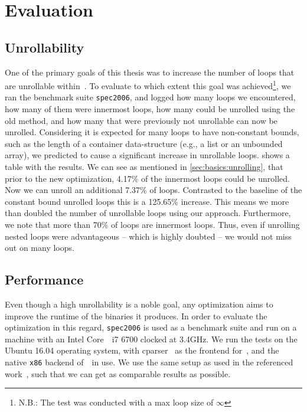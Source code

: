 \chapter{Evaluation}\label{sec:eval}

\section{Unrollability}\label{sec:eval:unrollability}

One of the primary goals of this thesis was to increase the number of loops that are unrollable within~\libFIRM.
To evaluate to which extent this goal was achieved\footnote{N.B.: The test was conducted with a max loop size of $\infty$}, we ran the benchmark suite \texttt{spec2006}, and logged how many loops we encountered, how many of them were innermost loops, how many could be unrolled using the old method, and how many that were previously not unrollable can now be unrolled.
Considering it is expected for many loops to have non-constant bounds, such as the length of a container data-structure (e.g., a list or an unbounded array), we predicted to cause a significant increase in unrollable loops.
 shows a table with the results.
We can see as mentioned in \cref{sec:basics:unrolling}, that prior to the new optimization, 4.17\% of the innermost loops could be unrolled.
Now we can unroll an additional 7.37\% of loops.
Contrasted to the baseline of the constant bound unrolled loops this is a 125.65\% increase.
This means we more than doubled the number of unrollable loops using our approach.
Furthermore, we note that more than 70\% of loops are innermost loops.
Thus, even if unrolling nested loops were advantageous -- which is highly doubted -- we would not miss out on many loops.




\section{Performance}\label{sec:eval:perf}

Even though a high unrollability is a noble goal, any optimization aims to improve the runtime of the binaries it produces.
In order to evaluate the optimization in this regard, \texttt{spec2006} is used as a benchmark suite and run on a machine with an Intel Core~\textregistered~i7 6700 clocked at 3.4GHz.
We run the tests on the Ubuntu 16.04 operating system, with cparser~\cite{cparser} as the frontend for~\libFIRM, and the native \texttt{x86} backend of~\libFIRM~in use.
We use the same setup as used in the referenced work~\cite{aebi18bachelorarbeit}, such that we can get as comparable results as possible.

